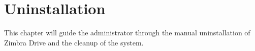 \chapter{Uninstallation}\label{cha:uninstallation}
This chapter will guide the administrator through the manual uninstallation of Zimbra Drive and
the cleanup of the system.



